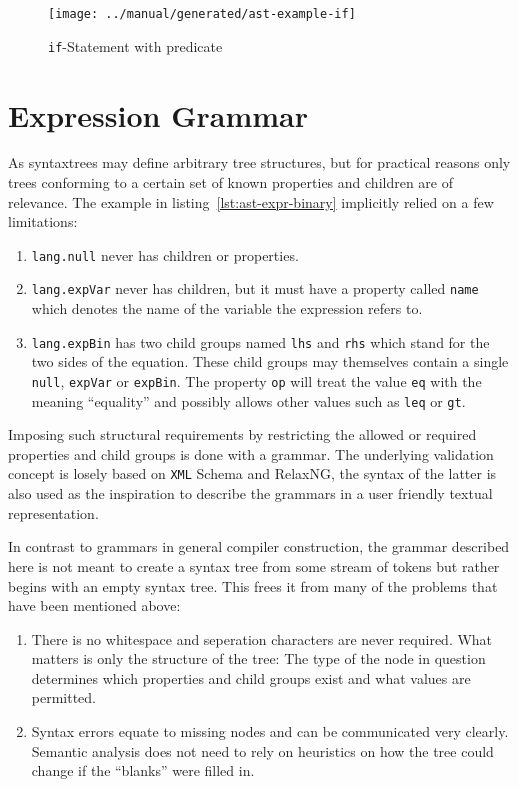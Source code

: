 \documentclass[sigconf,natbib=false,review=true]{acmart}
\newcommand\astScale{0.75}
\begin{document}
\begin{figure*}
  \texttt{[image: ../manual/generated/ast-example-if]}
  \caption{\texttt{if}-Statement with predicate}
  \label{fig:if-stmt-pred}
\end{figure*}

\section{Expression Grammar}

As syntaxtrees may define arbitrary tree structures, but for practical reasons only trees conforming to a certain set of known properties and children are of relevance. The example in listing~\ref{lst:ast-expr-binary} implicitly relied on a few limitations:

\begin{enumerate}
\item \texttt{lang.null} never has children or properties.

\item \texttt{lang.expVar} never has children, but it must have a property called \texttt{name} which denotes the name of the variable the expression refers to.

\item \texttt{lang.expBin} has two child groups named \texttt{lhs} and \texttt{rhs} which stand for the two sides of the equation. These child groups may themselves contain a single \texttt{null}, \texttt{expVar} or \texttt{expBin}. The property \texttt{op} will treat the value \texttt{eq} with the meaning \enquote{equality} and possibly allows other values such as \texttt{leq} or \texttt{gt}.
\end{enumerate}

Imposing such structural requirements by restricting the allowed or required properties and child groups is done with a grammar. The underlying validation concept is losely based on \texttt{XML} Schema and RelaxNG, the syntax of the latter is also used as the inspiration to describe the grammars in a user friendly textual representation.

In contrast to grammars in general compiler construction, the grammar described here is not meant to create a syntax tree from some stream of tokens but rather begins with an empty syntax tree. This frees it from many of the problems that have been mentioned above:

\begin{enumerate}
\item There is no whitespace and seperation characters are never required. What matters is only the structure of the tree: The type of the node in question determines which properties and child groups exist and what values are permitted.
\item Syntax errors equate to missing nodes and can be communicated very clearly. Semantic analysis does not need to rely on heuristics on how the tree could change if the \enquote{blanks} were filled in.
\end{enumerate}
\end{document}
